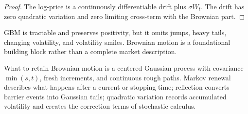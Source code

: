 \documentclass[10pt]{article}
\newcommand{\1}{\mathbf 1}
\theoremstyle{definition}
\begin{document}
\begin{proof}
The log-price is a continuously differentiable drift plus \(\sigma W_t\).
The drift has zero quadratic variation and zero limiting cross-term with the
Brownian part.
\end{proof}

GBM is tractable and preserves positivity, but it omits jumps, heavy tails,
changing volatility, and volatility smiles. Brownian motion is a foundational
building block rather than a complete market description.

\begin{keyidea}{What to retain}
Brownian motion is a centered Gaussian process with covariance
\(\min(s,t)\), fresh increments, and continuous rough paths. Markov renewal
describes what happens after a current or stopping time; reflection converts
barrier events into Gaussian tails; quadratic variation records accumulated
volatility and creates the correction terms of stochastic calculus.
\end{keyidea}
\end{document}
